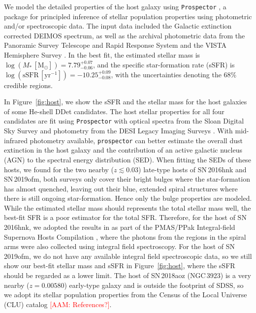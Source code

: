 \documentclass[twocolumn]{aastex631}
\newcommand{\adam}[1]{\textcolor{red}{[AAM: #1]}}
\begin{document}
We model the detailed properties of the host galaxy using \texttt{Prospector} \citep{Johnson_prospector_2021}, a package for principled inference of stellar population properties using photometric and/or spectroscopic data. The input data included the Galactic extinction corrected DEIMOS spectrum, as well as the archival photometric data from the Panoramic Survey Telescope and Rapid Response System \citep[Pan-STARRS;][{\it r, i, z} Kron magnitudes]{PS1_2016}  and the VISTA Hemisphere Survey \citep[VHS;][J and $\mathrm{K}_\mathrm{s}$ Petrosian magnitudes]{VHS_2013}. In the best fit, the estimated stellar mass is $\log (M_*\,[\mathrm{M_\odot}])=7.79_{-0.06}^{+0.07}$, and the specific star-formation rate (sSFR) is $\log (\mathrm{sSFR}\,[\mathrm{yr}^{-1}])=-10.25_{-0.08}^{+0.09}$, with the uncertainties denoting the 68\% credible regions.

In Figure~\ref{fig:host}, we show the sSFR and the stellar mass for the host galaxies of some He-shell DDet candidates. The host stellar properties for all four candidates are fit using \texttt{Prospector} with optical spectra from the Sloan Digital Sky Survey \citep[SDSS;][]{York_2000} and photometry from the DESI Legacy Imaging Surveys \citep[][{\it g, r, z, $W_1$, $W_2$} magnitudes]{Dey_2019}. With mid-infrared photometry available, \texttt{prospector} can better estimate the overall dust extinction in the host galaxy and the contribution of an active galactic nucleus (AGN) to the spectral energy distribution (SED). When fitting the SEDs of these hosts, we found for the two nearby ($z\lesssim0.03$) late-type hosts of SN\,2016hnk and SN\,2019ofm, both surveys only cover their bright bulges where the star-formation has almost quenched, leaving out their blue, extended spiral structures where there is still ongoing star-formation. Hence only the bulge properties are modeled. While the estimated stellar mass should represents the total stellar mass well, the best-fit SFR is a poor estimator for the total SFR. Therefore, for the host of SN\,2016hnk, we adopted the results in \citet{galbany_16hnk_2019} as part of the PMAS/PPak Integral-field Supernova Hosts Compilation \citep[PISCO;][]{Galbany_PISCO_2018}, where the photons from the  regions in the spiral arms were also collected using integral field spectroscopy. For the host of SN\,2019ofm, we do not have any available integral field spectroscopic data, so we still show our best-fit stellar mass and sSFR in Figure~\ref{fig:host}, where the sSFR should be regarded as a lower limit. The host of SN\,2018aoz (NGC\,3923) is a very nearby ($z=0.00580$) early-type galaxy and is outside the footprint of SDSS, so we adopt its stellar population properties from the Census of the Local Universe (CLU) catalog \adam{References?}.
\end{document}

